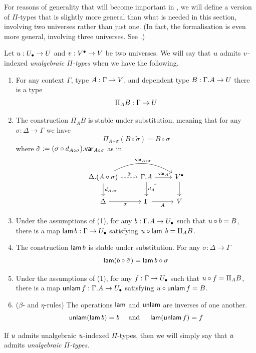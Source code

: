 For reasons of generality that will become important in ,
we will define a version of $\Pi$-types that is slightly more general than what is needed in this section,
involving two universes rather than just one.
(In fact, the formalisation is even more general,
involving three universes. See .)
\begin{definition}
  \label{def:elementary-pi}
  Let ${u} : {U_\bullet} \to U$ and ${v} : {V^\bullet} \to V$ be two universes.
  We will say that ${u}$ admits ${v}$-indexed \emph{unalgebraic $\Pi$-types}
  when we have the following.
  \begin{enumerate}
  \item 
    For any context $\Gamma$, type $A : \Gamma \to V$,
    and dependent type $B : \Gamma . A \to U$
    there is a type \[\Pi_A B : \Gamma \to U\]
  \item
    The construction $\Pi_A B$ is stable under substitution,
    meaning that for any $\sigma : \Delta \to \Gamma$ we have
    \[
      \Pi_{A \circ \sigma} (B \circ \tilde{\sigma}) =
      B \circ \sigma
    \]
    where $\tilde{\sigma} := (\sigma \circ d_{A \circ \sigma}) . \mathsf{var}_{A \circ \sigma}$ as in
    \[
    \begin{tikzcd}
      {\Delta . {(A \circ \sigma)}} & {\Gamma . A} & \Vlow \\
      \Delta & \Gamma & \V
      \arrow["{{\tilde{\sigma}}}", dashed, from=1-1, to=1-2]
      \arrow["{\var_{A \circ \sigma}}", bend left, from=1-1, to=1-3]
      \arrow["{d_{A \circ \sigma}}", from=1-1, to=2-1]
      \arrow["{\var_A}", from=1-2, to=1-3]
      \arrow["{d_A}", from=1-2, to=2-2]
      \arrow["\lrcorner"{anchor=center, pos=0.125}, draw=none, from=1-2, to=2-3]
      \arrow[from=1-3, to=2-3]
      \arrow["\sigma"', from=2-1, to=2-2]
      \arrow["A"', from=2-2, to=2-3]
    \end{tikzcd}
    \]
  \item
    Under the assumptions of (1),
    for any $b : \Gamma . A \to {U_\bullet}$
    such that ${u} \circ b = B$,
    there is a map $\mathop{\mathsf{lam}}  b : \Gamma \to {U_\bullet}$
    satisfying ${u} \circ \mathop{\mathsf{lam}} \;b  = \Pi_A B$.
  \item
    The construction $\mathop{\mathsf{lam}}  b$ is stable under substitution.
    For any $\sigma : \Delta \to \Gamma$
    \[
      \mathop{\mathsf{lam}} (b \circ \tilde{\sigma}) =
      \mathop{\mathsf{lam}}  b \circ \sigma
    \]
  \item
    Under the assumptions of (1),
    for any $f : \Gamma \to {U_\bullet}$
    such that ${u} \circ f = \Pi_A B$,
    there is a map $\mathop{\mathsf{unlam}}  f : \Gamma . A \to {U_\bullet}$
    satisfying ${u} \circ \mathop{\mathsf{unlam}}  f  = B$.
  \item ($\beta$- and $\eta$-rules) The operations 
    $\mathop{\mathsf{lam}}$ and $\mathop{\mathsf{unlam}}$ are inverses of one another.
    \[ \mathop{\mathsf{unlam}} (\mathop{\mathsf{lam}}  b) = b \quad \text{ and } 
    \quad \mathop{\mathsf{lam}} (\mathop{\mathsf{unlam}}  f) = f\]
  \end{enumerate}
  If ${u}$ admits unalgebraic ${u}$-indexed $\Pi$-types,
  then we will simply say that ${u}$ admits
  \emph{unalgebraic $\Pi$-types}.
\end{definition}
